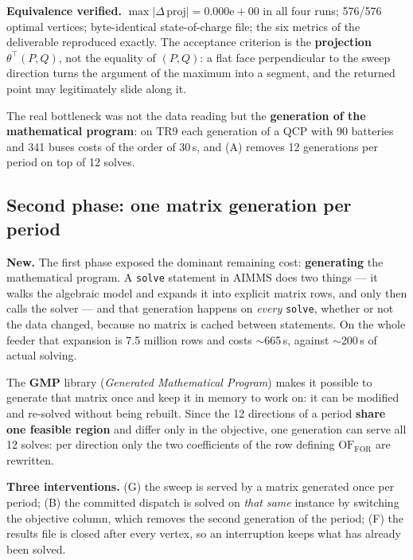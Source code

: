 \documentclass[11pt,a4paper]{article}
\newcommand{\nw}[1]{\textcolor{uaired}{#1}}
\begin{document}
\begin{keybox}
\textbf{Equivalence verified.} $\max|\Delta\,\mathrm{proj}| = 0.000\mathrm{e}{+}00$ in all four
runs; 576/576 optimal vertices; byte-identical state-of-charge file; the six metrics of the
deliverable reproduced exactly. The acceptance criterion is the \textbf{projection}
$\theta^\top(P,Q)$, not the equality of $(P,Q)$: a flat face perpendicular to the sweep direction
turns the argument of the maximum into a segment, and the returned point may legitimately slide along it.
\end{keybox}

\vspace{2pt}


\vspace{2pt}
The real bottleneck was not the data reading but the \textbf{generation of the mathematical
program}: on TR9 each generation of a QCP with 90 batteries and 341 buses costs of the order of
30\,s, and \nw{(A)} removes 12 generations per period on top of 12 solves.

\subsection{\nw{Second phase: one matrix generation per period}}

\begin{nuevo}
\textbf{\nw{New.}} The first phase exposed the dominant remaining cost: \textbf{generating} the
mathematical program. A \texttt{solve} statement in AIMMS does two things --- it walks the algebraic
model and expands it into explicit matrix rows, and only then calls the solver --- and that
generation happens on \emph{every} \texttt{solve}, whether or not the data changed, because no
matrix is cached between statements. On the whole feeder that expansion is 7.5 million rows and
costs $\sim$665\,s, against $\sim$200\,s of actual solving.

The \textbf{GMP} library (\emph{Generated Mathematical Program}) makes it possible to generate that
matrix once and keep it in memory to work on: it can be modified and re-solved without being rebuilt.
Since the 12 directions of a period \textbf{share one feasible region} and differ only in the
objective, one generation can serve all 12 solves: per direction only the two coefficients of the row
defining $\mathrm{OF}_{\mathrm{FOR}}$ are rewritten.
\end{nuevo}

\textbf{Three interventions.} \nw{(G)} the sweep is served by a matrix generated once per period;
\nw{(B)} the committed dispatch is solved on \emph{that same} instance by switching the objective
column, which removes the second generation of the period; \nw{(F)} the results file is closed after
every vertex, so an interruption keeps what has already been solved.
\end{document}
